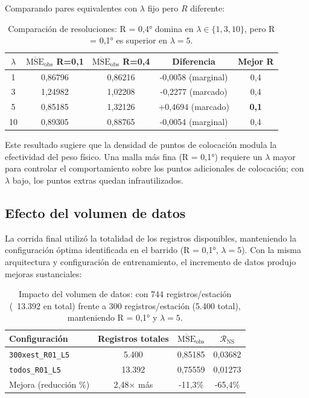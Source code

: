 Comparando pares equivalentes con $\lambda$ fijo pero $R$ diferente:

\begin{table}[H]
\centering
\begin{tabular}{ccccc}
\hline
$\lambda$ & $\overline{\text{MSE}}_{\text{obs}}$ R=0,1 & $\overline{\text{MSE}}_{\text{obs}}$ R=0,4 & Diferencia & Mejor R \\
\hline
1 & 0,86796 & 0,86216 & -0,0058 (marginal) & 0,4 \\
3 & 1,24982 & 1,02208 & -0,2277 (marcado) & 0,4 \\
5 & 0,85185 & 1,32126 & +0,4694 (marcado) & \textbf{0,1} \\
10 & 0,89305 & 0,88765 & -0,0054 (marginal) & 0,4 \\
\hline
\end{tabular}
\caption{Comparación de resoluciones: R = 0,4° domina en $\lambda \in \{1, 3, 10\}$, pero R = 0,1° es superior en $\lambda = 5$.}
\label{tab:efecto_resolucion}
\end{table}

Este resultado sugiere que la densidad de puntos de colocación modula la efectividad del peso físico. Una malla más fina (R = 0,1°) requiere un $\lambda$ mayor para controlar el comportamiento sobre los puntos adicionales de colocación; con $\lambda$ bajo, los puntos extras quedan infrautilizados.

\subsection{Efecto del volumen de datos}

La corrida final utilizó la totalidad de los registros disponibles, manteniendo la configuración óptima identificada en el barrido (R = 0,1°, $\lambda = 5$). Con la misma arquitectura y configuración de entrenamiento, el incremento de datos produjo mejoras sustanciales:

\begin{table}[H]
\centering
\begin{tabular}{lccc}
\hline
Configuración & Registros totales & $\overline{\text{MSE}}_{\text{obs}}$ & $\mathcal{R}_{\text{NS}}$ \\
\hline
\texttt{300xest\_R01\_L5} & 5.400 & 0,85185 & 0,03682 \\
\texttt{todos\_R01\_L5} & 13.392 & 0,75559 & 0,01273 \\
\hline
Mejora (reducción \%) & 2,48× más & -11,3\% & -65,4\% \\
\hline
\end{tabular}
\caption{Impacto del volumen de datos: con 744 registros/estación (~13.392 en total) frente a 300 registros/estación (5.400 total), manteniendo R = 0,1° y $\lambda = 5$.}
\label{tab:efecto_volumen}
\end{table}

